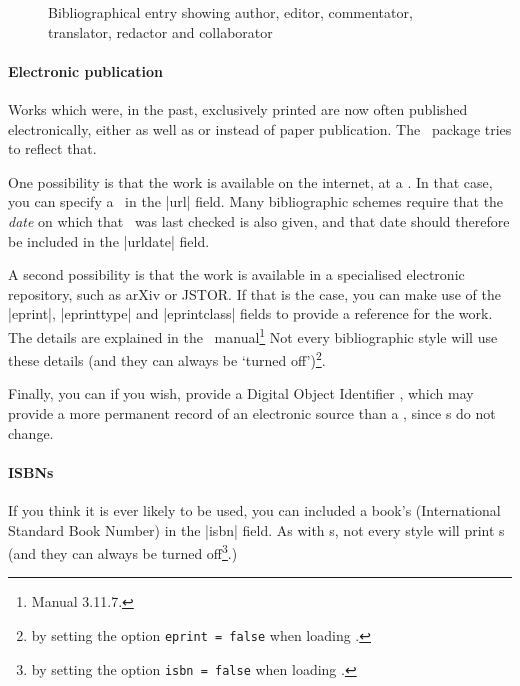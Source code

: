 {\begin{figure}
\caption{Bibliographical entry showing author, editor, commentator, translator, redactor and collaborator\label{redactors}}
\end{figure}

\paragraph{Electronic publication} Works which were, in the past, exclusively printed are now often published electronically, either as well as or instead of paper publication. The \biblatex\ package tries to reflect that.

One possibility is that the work is available on the internet, at a \URL. In that case, you can specify a \URL\ in the |url| field. Many bibliographic schemes require that the \emph{date} on which that \URL\ was last checked is also given, and that date should therefore be included in the |urldate| field.

A second possibility is that the work is available in a specialised electronic repository, such as arXiv or JSTOR. If that is the case, you can make use of the |eprint|, |eprinttype| and |eprintclass| fields to provide a reference for the work. The details are explained in the \biblatex\ manual\footnote{Manual 3.11.7.} Not every bibliographic style will use these details (and they can always be `turned off')\footnote{by setting the option \texttt{eprint = false} when loading \biblatex.}.

Finally, you can if you wish, provide a Digital Object Identifier , which may provide a more permanent record of an electronic source than a \URL, since s do not change.

\paragraph{ISBNs} If you think it is ever likely to be used, you can included a book's  (International Standard Book Number) in the |isbn| field. As with s, not every style will print s (and they can always be turned off\footnote{by setting the option \texttt{isbn = false} when loading \biblatex.}.)

}
